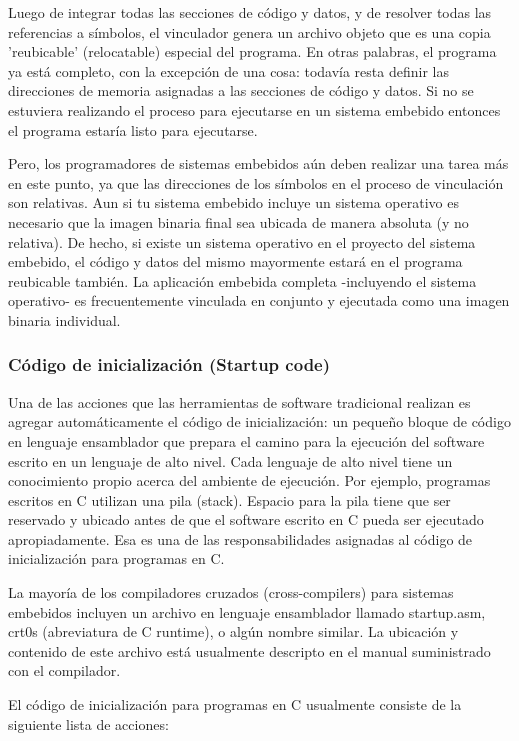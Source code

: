 \documentclass[output=paper, 
colorlinks,
citecolor=brown,
newtxmath
]{langscibook}
\begin{document}
Luego de integrar todas las secciones de código y datos, y de resolver todas
las referencias a símbolos, el vinculador genera un archivo objeto que es
una copia 'reubicable' (relocatable) especial del programa. En otras palabras,
el programa ya está completo, con la excepción de una cosa: todavía
resta definir las direcciones de memoria asignadas a las secciones de código y 
datos. Si no se estuviera realizando el proceso para ejecutarse en un 
sistema embebido entonces el programa estaría listo para ejecutarse.

Pero, los programadores de sistemas embebidos aún deben realizar una
tarea más en este punto, ya que 
las direcciones de los símbolos en el proceso de vinculación son relativas.
Aun si tu sistema embebido incluye un sistema operativo es necesario
que la imagen binaria final sea ubicada de manera absoluta (y no relativa).
De hecho, si existe un sistema operativo en el proyecto del sistema embebido,
el código y datos del mismo mayormente estará en el programa reubicable 
también.
La aplicación embebida completa -incluyendo el sistema operativo- es
frecuentemente vinculada en conjunto y ejecutada como una imagen binaria
individual.

\subsubsection {Código de inicialización (Startup code)}

Una de las acciones que las herramientas de software tradicional realizan
es agregar automáticamente el código de inicialización: un pequeño bloque
de código en lenguaje ensamblador que prepara el camino para la ejecución
del software escrito en un lenguaje de alto nivel. Cada lenguaje de alto
nivel tiene un conocimiento propio acerca del ambiente de ejecución.
Por ejemplo, programas escritos en C utilizan una pila (stack). Espacio
para la pila tiene que ser reservado y ubicado antes de que el software escrito
en C pueda ser ejecutado apropiadamente. Esa es una de las responsabilidades
asignadas al código de inicialización para programas en C.

La mayoría de los compiladores cruzados (cross-compilers) para sistemas
embebidos incluyen un archivo en lenguaje ensamblador llamado startup.asm, crt0s
(abreviatura de C runtime), o algún nombre similar. La ubicación y contenido de este
archivo está usualmente descripto en el manual suministrado con el compilador.

El código de inicialización para programas en C usualmente consiste de la siguiente
lista de acciones:
\end{document}
